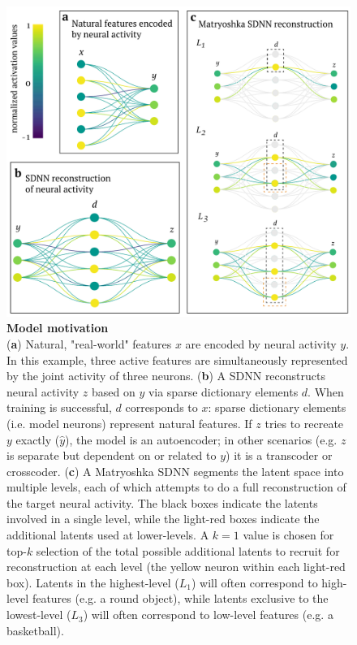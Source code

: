 \begin{figure}[htbp]
    \begin{minipage}{0.63\linewidth}
    \includegraphics[width=\linewidth]{figures/sdnn_arch.pdf}
    \end{minipage}%
    \begin{minipage}{0.37\linewidth}
    \caption{
        \textbf{Model motivation} \\
        \small
        (\textbf{a}) Natural, "real-world" features $x$ are encoded by neural activity $y$. In this example, three active features are simultaneously represented by the joint activity of three neurons. (\textbf{b}) A SDNN reconstructs neural activity $z$ based on $y$ via sparse dictionary elements $d$. When training is successful, $d$ corresponds to $x$: sparse dictionary elements (i.e. model neurons) represent natural features. If $z$ tries to recreate $y$ exactly ($\hat{y}$), the model is an autoencoder; in other scenarios (e.g. $z$ is separate but dependent on or related to $y$) it is a transcoder or crosscoder. (\textbf{c}) A Matryoshka SDNN segments the latent space into multiple levels, each of which attempts to do a full reconstruction of the target neural activity. The black boxes indicate the latents involved in a single level, while the light-red boxes indicate the additional latents used at lower-levels. A $k = 1$ value is chosen for top-$k$ selection of the total possible additional latents to recruit for reconstruction at each level (the yellow neuron within each light-red box). Latents in the highest-level ($L_1$) will often correspond to high-level features (e.g. a round object), while latents exclusive to the lowest-level ($L_3$) will often correspond to low-level features (e.g. a basketball).
    }
    \label{figure:sdnn_arch}
    \end{minipage}
\end{figure}


